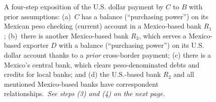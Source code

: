 \begin{figure}[!ht]
\caption[A four-step exposition of the U.S. dollar payment by $C$ to $B$, steps 1 and 2]%
{A four-step exposition of the U.S. dollar payment by $C$ to $B$ with prior assumptions: (a)~$C$ has a balance (``purchasing power'') on its Mexican peso checking (current) account in a Mexico-based bank $R_1$; (b)~there is another Mexico-based bank $R_3$, which serves a Mexico-based exporter $D$ with a balance (``purchasing power'') on its U.S. dollar account thanks to a \textit{prior} cross-border payment; (c) there is a Mexico's central bank, which clears peso-denominated debts and credits for local banks; and (d) the U.S.-based bank $R_2$ and all mentioned Mexico-based banks have correspondent relationships.~\textit{See steps (3) and (4) on the next page.}}%
\label{fig:US_MX_payment5}
\end{figure}
